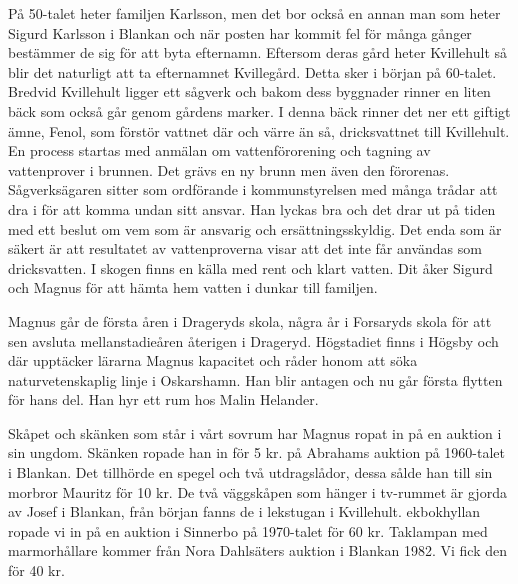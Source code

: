 På 50-talet heter familjen Karlsson, men det bor också en annan man som heter Sigurd Karlsson i Blankan och när posten har kommit fel för många gånger bestämmer de sig för att byta efternamn. Eftersom deras gård heter Kvillehult så blir det naturligt att ta efternamnet Kvillegård. Detta sker i början på 60-talet. 
Bredvid Kvillehult ligger ett sågverk och bakom dess byggnader rinner en liten bäck som också går genom gårdens marker. I denna bäck rinner det ner ett giftigt ämne, Fenol, som förstör vattnet där och värre än så, dricksvattnet till Kvillehult. En process startas med anmälan om vattenförorening och tagning av vattenprover i brunnen. Det grävs en ny brunn men även den förorenas. Sågverksägaren sitter som ordförande i kommunstyrelsen med många trådar att dra i för att komma undan sitt ansvar. Han lyckas bra och det drar ut på tiden med ett beslut om vem som är ansvarig och ersättningsskyldig. Det enda som är säkert är att resultatet av vattenproverna visar att det inte får användas som dricksvatten. I skogen finns en källa med rent och klart vatten. Dit åker Sigurd och Magnus för att hämta hem vatten i dunkar till familjen.

Magnus går de första åren i Drageryds skola, några år i Forsaryds skola för att sen avsluta mellanstadieåren återigen i Drageryd. Högstadiet finns i Högsby och där upptäcker lärarna Magnus kapacitet och råder honom att söka naturvetenskaplig linje i Oskarshamn. Han blir antagen och nu går första flytten för hans del. Han hyr ett rum hos Malin Helander.

Skåpet och skänken som står i vårt sovrum har Magnus ropat in på en auktion i sin ungdom. Skänken ropade han in för 5 kr. på Abrahams auktion på 1960-talet i Blankan. Det tillhörde en spegel och två utdragslådor, dessa sålde han till sin morbror Mauritz för 10 kr.
De två väggskåpen som hänger i tv-rummet är gjorda av Josef i Blankan, från början fanns de i lekstugan i Kvillehult. ekbokhyllan ropade vi in på en auktion i Sinnerbo på 1970-talet för 60 kr.
Taklampan med marmorhållare kommer från Nora Dahlsäters auktion i Blankan 1982. Vi fick den för 40 kr.